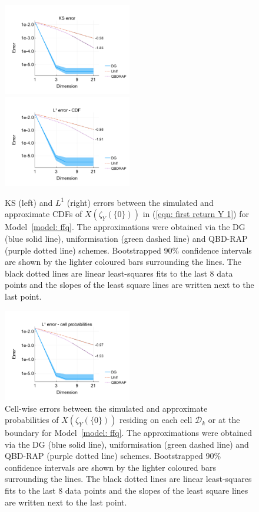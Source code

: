 \begin{figure}[h]
	\centering
	\includegraphics[width=0.5\textwidth,trim={0.75cm 0.8cm 0.25cm 1.25cm},clip]{chapter6/figs/ffq/cts/ks_error_formatted.pdf}%
	\includegraphics[width=0.5\textwidth,trim={0.75cm 0.8cm 0.25cm 1.25cm},clip]{chapter6/figs/ffq/cts/l1_cdf_error_formatted.pdf}
	\caption{KS (left) and \(L^1\) (right) errors between the simulated and approximate CDFs of \(X(\zeta_{Y}(\{0\}))\) in (\ref{eqn: first return Y 1}) for Model~\ref{model: ffq}. The approximations were obtained via the DG (blue solid line), uniformisation (green dashed line) and QBD-RAP (purple dotted line) schemes. Bootstrapped 90\% confidence intervals are shown by the lighter coloured bars surrounding the lines. The black dotted lines are linear least-squares fits to the last 8 data points and the slopes of the least square lines are written next to the last point.} 
	\label{fig: ffq return cts} 
\end{figure}
\begin{figure}[h]
	\centering
	\includegraphics[width=0.5\textwidth,trim={0.75cm 0.8cm 0.25cm 1.25cm},clip]{chapter6/figs/ffq/cts/l1_cell_probs_error_formatted.pdf}%
	\caption{Cell-wise errors between the simulated and approximate probabilities of \(X(\zeta_{Y}(\{0\}))\) residing on each cell \(\mathcal D_k\) or at the boundary for Model~\ref{model: ffq}. The approximations were obtained via the DG (blue solid line), uniformisation (green dashed line) and QBD-RAP (purple dotted line) schemes. Bootstrapped 90\% confidence intervals are shown by the lighter coloured bars surrounding the lines. The black dotted lines are linear least-squares fits to the last 8 data points and the slopes of the least square lines are written next to the last point.} 
	\label{fig: ffq cell probs} 
\end{figure}
